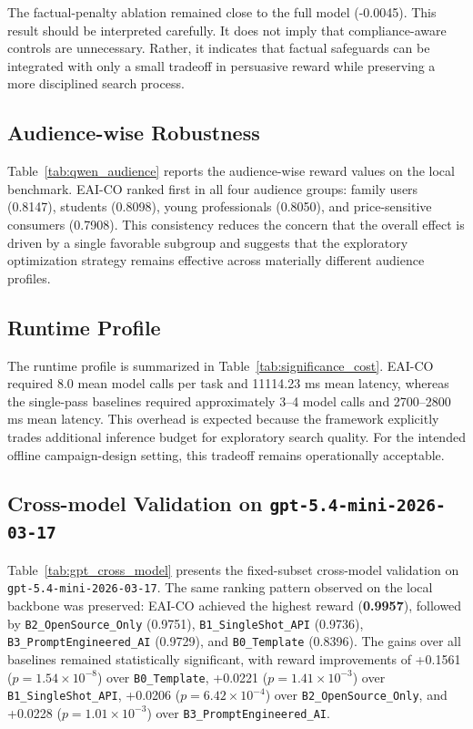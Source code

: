 The factual-penalty ablation remained close to the full model (-0.0045). This result should be interpreted carefully. It does not imply that compliance-aware controls are unnecessary. Rather, it indicates that factual safeguards can be integrated with only a small tradeoff in persuasive reward while preserving a more disciplined search process.

\subsection{Audience-wise Robustness}

Table~\ref{tab:qwen_audience} reports the audience-wise reward values on the local benchmark. EAI-CO ranked first in all four audience groups: family users (0.8147), students (0.8098), young professionals (0.8050), and price-sensitive consumers (0.7908). This consistency reduces the concern that the overall effect is driven by a single favorable subgroup and suggests that the exploratory optimization strategy remains effective across materially different audience profiles.

\subsection{Runtime Profile}

The runtime profile is summarized in Table~\ref{tab:significance_cost}. EAI-CO required 8.0 mean model calls per task and 11114.23 ms mean latency, whereas the single-pass baselines required approximately 3--4 model calls and 2700--2800 ms mean latency. This overhead is expected because the framework explicitly trades additional inference budget for exploratory search quality. For the intended offline campaign-design setting, this tradeoff remains operationally acceptable.

\subsection{Cross-model Validation on \texttt{gpt-5.4-mini-2026-03-17}}

Table~\ref{tab:gpt_cross_model} presents the fixed-subset cross-model validation on \texttt{gpt-5.4-mini-2026-03-17}. The same ranking pattern observed on the local backbone was preserved: EAI-CO achieved the highest reward (\textbf{0.9957}), followed by \texttt{B2\_OpenSource\_Only} (0.9751), \texttt{B1\_SingleShot\_API} (0.9736), \texttt{B3\_PromptEngineered\_AI} (0.9729), and \texttt{B0\_Template} (0.8396). The gains over all baselines remained statistically significant, with reward improvements of +0.1561 ($p=1.54\times10^{-8}$) over \texttt{B0\_Template}, +0.0221 ($p=1.41\times10^{-3}$) over \texttt{B1\_SingleShot\_API}, +0.0206 ($p=6.42\times10^{-4}$) over \texttt{B2\_OpenSource\_Only}, and +0.0228 ($p=1.01\times10^{-3}$) over \texttt{B3\_PromptEngineered\_AI}.

